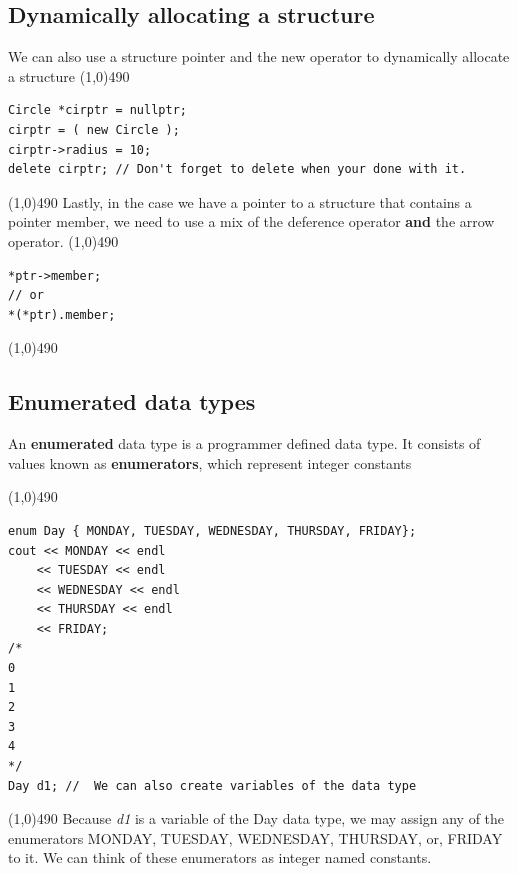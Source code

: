 \documentclass{report}
\begin{document}
	\bigbreak \noindent 
	\subsection{Dynamically allocating a structure}
	\bigbreak \noindent 
	We can also use a structure pointer and the new operator to dynamically allocate a structure
	\bigbreak \noindent 
	\line(1,0){490}
	\begin{verbatim}
Circle *cirptr = nullptr;
cirptr = ( new Circle );
cirptr->radius = 10;
delete cirptr; // Don't forget to delete when your done with it.
	\end{verbatim}
	\line(1,0){490}
	\bigbreak \noindent 
	\bigbreak \noindent 
	Lastly, in the case we have a pointer to a structure that contains a pointer member, we need to use a mix of the deference operator \textbf{and} the arrow operator. 
	\bigbreak \noindent 
	\line(1,0){490}
	\begin{verbatim}
*ptr->member;
// or
*(*ptr).member;
	\end{verbatim}
	\line(1,0){490}

	\pagebreak \bigbreak \noindent 
	\subsection{Enumerated data types}
	\bigbreak \noindent 
	\begin{concept}
	   An \textbf{enumerated} data type is a programmer defined data type. It consists of values known as \textbf{enumerators}, which represent integer constants 
	\end{concept}
	\bigbreak \noindent 
	\line(1,0){490}
	\begin{verbatim}
enum Day { MONDAY, TUESDAY, WEDNESDAY, THURSDAY, FRIDAY};
cout << MONDAY << endl 
    << TUESDAY << endl 
    << WEDNESDAY << endl 
    << THURSDAY << endl 
    << FRIDAY;
/*
0
1
2
3
4
*/
Day d1; //	We can also create variables of the data type
	\end{verbatim}
	\line(1,0){490}
	\bigbreak \noindent 
    Because \textit{d1} is a variable of the Day data type, we may assign any of the enumerators MONDAY, TUESDAY, WEDNESDAY, THURSDAY, or, FRIDAY to it.
    \bigbreak \noindent 
    We can think of these enumerators as integer named constants.
\end{document}
